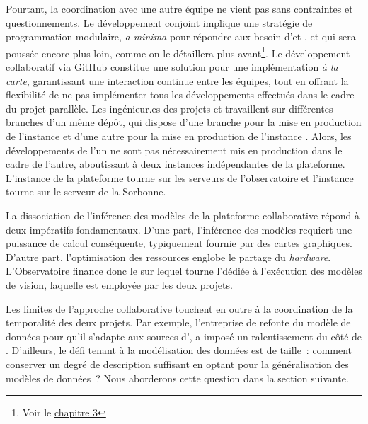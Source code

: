 Pourtant, la coordination avec une autre équipe ne vient pas sans
contraintes et questionnements. Le développement conjoint implique une
stratégie de programmation modulaire, \emph{a minima} pour répondre aux
besoin d'\eida et \vhs, et qui sera poussée encore plus loin, comme on le
détaillera plus avant\footnote{Voir le \hyperlink{chapitre-3-EDA-image-ia}{chapitre 3}}. Le
développement collaboratif via GitHub constitue une solution pour une
implémentation \emph{à la carte}, garantissant une interaction continue
entre les équipes, tout en offrant la flexibilité de ne pas implémenter
tous les développements effectués dans le cadre du projet parallèle. Les
ingénieur.es des projets \eida et \vhs travaillent sur différentes branches
d'un même dépôt, qui dispose d'une branche pour la mise en production de
l'instance \eida et d'une autre pour la mise en production de
l'instance \vhs. Alors, les développements de l'un ne sont pas
nécessairement mis en production dans le cadre de l'autre, aboutissant à
deux instances indépendantes de la plateforme. L'instance \eida de la plateforme tourne
sur les serveurs de l'observatoire et l'instance \vhs tourne sur le
serveur de la Sorbonne.

La dissociation de l'inférence des modèles de la plateforme
collaborative répond à deux impératifs fondamentaux. D'une part,
l'inférence des modèles requiert une puissance de calcul conséquente,
typiquement fournie par des cartes graphiques. D'autre part,
l'optimisation des ressources englobe le partage du \emph{hardware}.
L'Observatoire finance donc le \gpu sur lequel tourne l'\api dédiée à
l'exécution des modèles de vision, laquelle est employée par les deux
projets.

Les limites de l'approche collaborative touchent en outre à la
coordination de la temporalité des deux projets. Par exemple,
l'entreprise de refonte du modèle de données pour qu'il s'adapte aux
sources d'\eida, a imposé un ralentissement du côté de \vhs. D'ailleurs,
le défi tenant à la modélisation des données est de taille~: comment
conserver un degré de description suffisant en optant pour la
généralisation des modèles de données~? Nous aborderons cette question
dans la section suivante.

